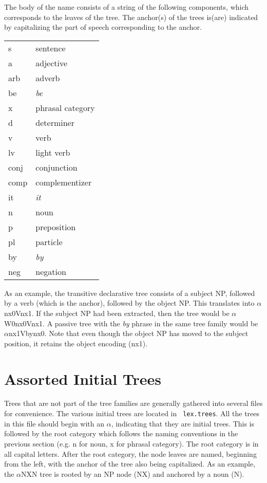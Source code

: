 \noindent The body of the name consists of a string of the following 
components, which corresponds to the leaves of the tree.  The anchor(s) of the
trees is(are) indicated by capitalizing the part of speech corresponding to the
anchor.

\begin{description}
\item\begin{tabular}{ll}
s&sentence\\
a&adjective\\
arb&adverb\\
be&{\it be}\\
x&phrasal category\\
d&determiner\\
v&verb\\
lv&light verb\\
conj&conjunction\\
comp&complementizer\\
it&{\it it}\\
n&noun\\
p&preposition\\
pl&particle\\
by&{\it by}\\
neg&negation\\
\end{tabular}
\end{description}

\noindent As an example, the transitive declarative tree consists of a subject
NP, followed by a verb (which is the anchor), followed by the object NP.  This
translates into $\alpha$nx0Vnx1.  If the subject NP had been extracted, then
the tree would be $\alpha$W0nx0Vnx1.  A passive tree with the {\it by} phrase
in the same tree family would be $\alpha$nx1Vbynx0.  Note that even though the
object NP has moved to the subject position, it retains the object encoding
(nx1).

\section{Assorted Initial Trees}

Trees that are not part of the tree families are generally gathered into
several files for convenience.  The various initial trees are located in {\tt
lex.trees}.  All the trees in this file should begin with an $\alpha$,
indicating that they are initial trees.  This is followed by the root category
which follows the naming conventions in the previous section (e.g. n for noun,
x for phrasal category).  The root category is in all capital letters.  After
the root category, the node leaves are named, beginning from the left, with the
anchor of the tree also being capitalized.  As an example, the $\alpha$NXN
tree is rooted by an NP node (NX) and anchored by a noun (N).

